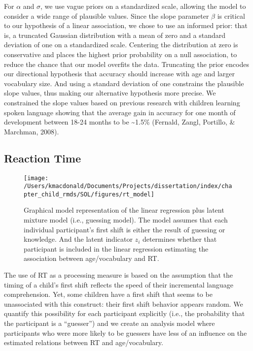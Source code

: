 \documentclass[oneside]{report}
\begin{document}
For \(\alpha\) and \(\sigma\), we use vague priors on a standardized
scale, allowing the model to consider a wide range of plausible values.
Since the slope parameter \(\beta\) is critical to our hypothesis of a
linear association, we chose to use an informed prior: that is, a
truncated Gaussian distribution with a mean of zero and a standard
deviation of one on a standardized scale. Centering the distribution at
zero is conservative and places the highest prior probability on a null
association, to reduce the chance that our model overfits the data.
Truncating the prior encodes our directional hypothesis that accuracy
should increase with age and larger vocabulary size. And using a
standard deviation of one constrains the plausible slope values, thus
making our alternative hypothesis more precise. We constrained the slope
values based on previous research with children learning spoken language
showing that the average gain in accuracy for one month of development
between 18-24 months to be \textasciitilde{}1.5\% (Fernald, Zangl,
Portillo, \& Marchman, 2008).

\hypertarget{reaction-time}{%
\subsection{Reaction Time}\label{reaction-time}}
\begin{figure}[t]

{\centering \texttt{[image: /Users/kmacdonald/Documents/Projects/dissertation/index/chapter\_child\_rmds/SOL/figures/rt\_model]} 

}

\caption[Graphical representation of the RT model.]{Graphical model representation of the linear regression plus latent mixture model (i.e., guessing model). The model assumes that each individual participant's first shift is either the result of guessing or knowledge. And the latent indicator $z_i$ determines whether that participant is included in the linear regression estimating the association between age/vocabulary and RT.}\label{fig:unnamed-chunk-8}
\end{figure}
The use of RT as a processing measure is based on the assumption that
the timing of a child's first shift reflects the speed of their
incremental language comprehension. Yet, some children have a first
shift that seems to be unassociated with this construct: their first
shift behavior appears random. We quantify this possibility for each
participant explicitly (i.e., the probability that the participant is a
``guesser'') and we create an analysis model where participants who were
more likely to be guessers have less of an influence on the estimated
relations between RT and age/vocabulary.
\end{document}
